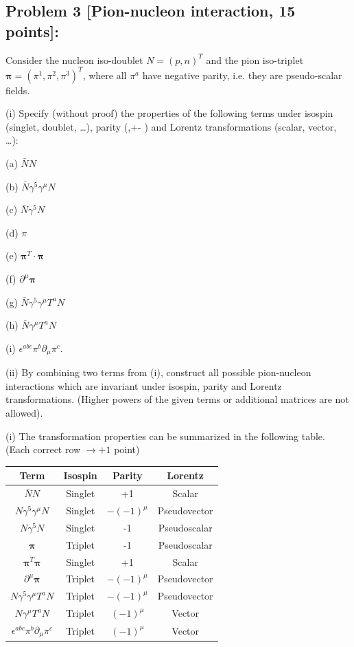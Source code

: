 \documentclass[10pt, letterpaper]{article}
\begin{document}
\subsection{Problem 3 [Pion-nucleon interaction, 15 points]:}

Consider the nucleon iso-doublet $N=(p, n)^T$ and the pion iso-triplet $\boldsymbol{\pi}=\left(\pi^1, \pi^2, \pi^3\right)^T$, where all $\pi^a$ have negative parity, i.e. they are pseudo-scalar fields.

(i) Specify (without proof) the properties of the following terms under isospin (singlet, doublet, …), parity (,+- ) and Lorentz transformations (scalar, vector, …):

(a) $\bar{N} N$

(b) $\bar{N} \gamma^5 \gamma^\mu N$

(c) $\bar{N} \gamma^5 N$

(d) $\pi$

(e) $\boldsymbol{\pi}^T \cdot \boldsymbol{\pi}$

(f) $\partial^\mu \boldsymbol{\pi}$

(g) $\bar{N} \gamma^5 \gamma^\mu T^a N$

(h) $\bar{N} \gamma^\mu T^a N$

(i) $\epsilon^{a b c} \pi^b \partial_\mu \pi^c$.

(ii) By combining two terms from (i), construct all possible pion-nucleon interactions which are invariant under isospin, parity and Lorentz transformations. (Higher powers of the given terms or additional matrices are not allowed).


(i) The transformation properties can be summarized in the following table.
(Each correct row $\rightarrow+1$ point)

\begin{tabular}{|c|c|c|c|}
\hline Term & Isospin & Parity & Lorentz \\
\hline $\bar{N} N$ & Singlet & +1 & Scalar \\
\hline$N \gamma^5 \gamma^\mu N$ & Singlet & $-(-1)^\mu$ & Pseudovector \\
\hline$N \gamma^5 N$ & Singlet & -1 & Pseudoscalar \\
\hline $\boldsymbol{\pi}$ & Triplet & -1 & Pseudoscalar \\
\hline $\boldsymbol{\pi}^T \boldsymbol{\pi}$ & Singlet & +1 & Scalar \\
\hline$\partial^\mu \boldsymbol{\pi}$ & Triplet & $-(-1)^\mu$ & Pseudovector \\
\hline$N \gamma^5 \gamma^\mu T^a N$ & Triplet & $-(-1)^\mu$ & Pseudovector \\
\hline$N \gamma^\mu T^a N$ & Triplet & $(-1)^\mu$ & Vector \\
\hline$\epsilon^{a b c} \pi^b \partial_\mu \pi^c$ & Triplet & $(-1)^\mu$ & Vector \\
\hline
\end{tabular}
\end{document}
